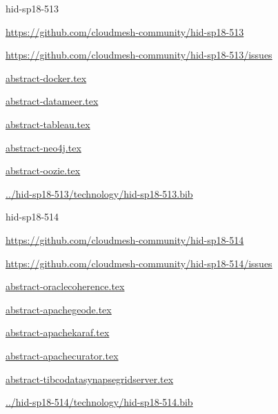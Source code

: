 \begin{IU}

hid-sp18-513

\url{https://github.com/cloudmesh-community/hid-sp18-513}

\url{https://github.com/cloudmesh-community/hid-sp18-513/issues}

\href{https://github.com/cloudmesh-community/hid-sp18-513/blob/master//technology/abstract-docker.tex}{abstract-docker.tex}

\href{https://github.com/cloudmesh-community/hid-sp18-513/blob/master//technology/abstract-datameer.tex}{abstract-datameer.tex}

\href{https://github.com/cloudmesh-community/hid-sp18-513/blob/master//technology/abstract-tableau.tex}{abstract-tableau.tex}

\href{https://github.com/cloudmesh-community/hid-sp18-513/blob/master//technology/abstract-neo4j.tex}{abstract-neo4j.tex}

\href{https://github.com/cloudmesh-community/hid-sp18-513/blob/master//technology/abstract-oozie.tex}{abstract-oozie.tex}

\href{https://github.com/cloudmesh-community/hid-sp18-513/blob/master//technology/hid-sp18-513.bib}{../hid-sp18-513/technology/hid-sp18-513.bib}

\end{IU}


\begin{IU}

hid-sp18-514

\url{https://github.com/cloudmesh-community/hid-sp18-514}

\url{https://github.com/cloudmesh-community/hid-sp18-514/issues}

\href{https://github.com/cloudmesh-community/hid-sp18-514/blob/master//technology/abstract-oraclecoherence.tex}{abstract-oraclecoherence.tex}

\href{https://github.com/cloudmesh-community/hid-sp18-514/blob/master//technology/abstract-apachegeode.tex}{abstract-apachegeode.tex}

\href{https://github.com/cloudmesh-community/hid-sp18-514/blob/master//technology/abstract-apachekaraf.tex}{abstract-apachekaraf.tex}

\href{https://github.com/cloudmesh-community/hid-sp18-514/blob/master//technology/abstract-apachecurator.tex}{abstract-apachecurator.tex}

\href{https://github.com/cloudmesh-community/hid-sp18-514/blob/master//technology/abstract-tibcodatasynapsegridserver.tex}{abstract-tibcodatasynapsegridserver.tex}

\href{https://github.com/cloudmesh-community/hid-sp18-514/blob/master//technology/hid-sp18-514.bib}{../hid-sp18-514/technology/hid-sp18-514.bib}

\end{IU}


